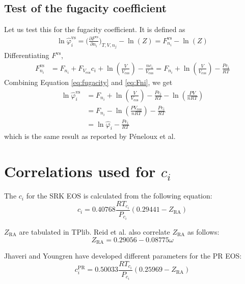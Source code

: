 \documentclass[english]{../thermomemo/thermomemo}
\newcommand{\eos}{\ensuremath{\text{eos}}\xspace}
\begin{document}
\subsection{Test of the fugacity coefficient}
Let us test this for the fugacity coefficient. It is defined as
\begin{align}
  \ln \hat{\varphi}_i^{\text{vs}} = \biggl( \frac{\partial F^{\text{vs}}}{\partial n_i} \biggr)_{T,V,n_j} - \ln \left( Z \right) = F_{n_i}^{\text{vs}} - \ln \left( Z \right)
  \label{eq:fugacity}
\end{align}
Differentiating $F^{\text{vs}}$,
\begin{align}
  F_{n_i}^{\text{vs}} &= F_{n_i} + F_{V_{\eos}}c_i  + \ln \left(\frac{V}{V_{\eos}} \right) - \frac{n c_i}{V_{\eos}} = F_{n_i} + \ln \left(\frac{V}{V_{\eos}} \right) - \frac{P c_i}{RT}
  \label{eq:Fni}
\end{align}
Combining Equation \ref{eq:fugacity} and \ref{eq:Fni}, we get
\begin{align}
  \ln \hat{\varphi}_i^{\text{vs}} &= F_{n_i} + \ln \left(\frac{V}{V_{\eos}} \right) - \frac{P c_i}{RT} - \ln \left( \frac{PV}{n RT} \right) \\
                      &= F_{n_i} - \ln \left( \frac{PV_{\eos}}{n RT} \right) - \frac{P c_i}{RT} \\
  &= \ln \hat{\varphi}_i - \frac{P c_i}{RT}
  \label{eq:fugacity2}
\end{align}
which is the same result as reported by P{\'e}neloux et al.


\section{Correlations used for $c_i$}
The $c_i$ for the SRK EOS is calculated from the following equation:
\begin{equation}
  c_i = 0.40768\frac{R T_{c_i}}{P_{c_i}}\left(0.29441- Z_{\text{RA}}\right)
\label{eq:ci}
\end{equation}

$Z_{\text{RA}}$ are tabulated in TPlib. Reid et al. \cite{Reid1987}
also correlate $Z_{\text{RA}}$ as follows:
\begin{equation}
  Z_{\text{RA}} = 0.29056 - 0.08775 \omega
\label{eq:zra}
\end{equation}

Jhaveri and Youngren \cite{Jhaveri1988} have developed different parameters for the PR EOS:
\begin{equation}
  c_i^{\text{PR}} = 0.50033\frac{R T_{c_i}}{P_{c_i}}\left(0.25969- Z_{\text{RA}}\right)
\label{eq:ci_PR}
\end{equation}
\end{document}
